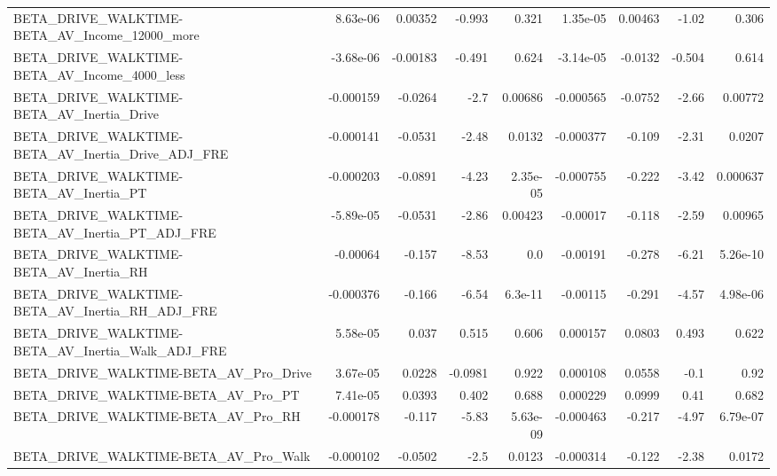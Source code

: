 \begin{tabular}{lrrrrrrrr}
BETA\_DRIVE\_WALKTIME-BETA\_AV\_Income\_12000\_more      &    8.63e-06 &      0.00352 &   -0.993 &    0.321 &   1.35e-05 &     0.00463 &        -1.02 &         0.306 \\
BETA\_DRIVE\_WALKTIME-BETA\_AV\_Income\_4000\_less       &   -3.68e-06 &     -0.00183 &   -0.491 &    0.624 &  -3.14e-05 &     -0.0132 &       -0.504 &         0.614 \\
BETA\_DRIVE\_WALKTIME-BETA\_AV\_Inertia\_Drive          &   -0.000159 &      -0.0264 &     -2.7 &  0.00686 &  -0.000565 &     -0.0752 &        -2.66 &       0.00772 \\
BETA\_DRIVE\_WALKTIME-BETA\_AV\_Inertia\_Drive\_ADJ\_FRE  &   -0.000141 &      -0.0531 &    -2.48 &   0.0132 &  -0.000377 &      -0.109 &        -2.31 &        0.0207 \\
BETA\_DRIVE\_WALKTIME-BETA\_AV\_Inertia\_PT             &   -0.000203 &      -0.0891 &    -4.23 & 2.35e-05 &  -0.000755 &      -0.222 &        -3.42 &      0.000637 \\
BETA\_DRIVE\_WALKTIME-BETA\_AV\_Inertia\_PT\_ADJ\_FRE     &   -5.89e-05 &      -0.0531 &    -2.86 &  0.00423 &   -0.00017 &      -0.118 &        -2.59 &       0.00965 \\
BETA\_DRIVE\_WALKTIME-BETA\_AV\_Inertia\_RH             &    -0.00064 &       -0.157 &    -8.53 &      0.0 &   -0.00191 &      -0.278 &        -6.21 &      5.26e-10 \\
BETA\_DRIVE\_WALKTIME-BETA\_AV\_Inertia\_RH\_ADJ\_FRE     &   -0.000376 &       -0.166 &    -6.54 &  6.3e-11 &   -0.00115 &      -0.291 &        -4.57 &      4.98e-06 \\
BETA\_DRIVE\_WALKTIME-BETA\_AV\_Inertia\_Walk\_ADJ\_FRE   &    5.58e-05 &        0.037 &    0.515 &    0.606 &   0.000157 &      0.0803 &        0.493 &         0.622 \\
BETA\_DRIVE\_WALKTIME-BETA\_AV\_Pro\_Drive              &    3.67e-05 &       0.0228 &  -0.0981 &    0.922 &   0.000108 &      0.0558 &         -0.1 &          0.92 \\
BETA\_DRIVE\_WALKTIME-BETA\_AV\_Pro\_PT                 &    7.41e-05 &       0.0393 &    0.402 &    0.688 &   0.000229 &      0.0999 &         0.41 &         0.682 \\
BETA\_DRIVE\_WALKTIME-BETA\_AV\_Pro\_RH                 &   -0.000178 &       -0.117 &    -5.83 & 5.63e-09 &  -0.000463 &      -0.217 &        -4.97 &      6.79e-07 \\
BETA\_DRIVE\_WALKTIME-BETA\_AV\_Pro\_Walk               &   -0.000102 &      -0.0502 &     -2.5 &   0.0123 &  -0.000314 &      -0.122 &        -2.38 &        0.0172 \\

\end{tabular}
